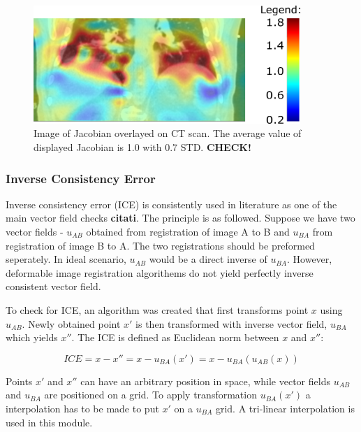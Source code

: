 \documentclass[type=dr, dr=rernat, accentcolor=tud7b,colorbacktitle, bigchapter, openright, twoside, 12pt ]{tudthesis}
\begin{document}
\begin{figure}[H]
	\begin{center}
		\includegraphics[width=0.9\textwidth]{./Images/Jacobian.png}
		\caption{Image of Jacobian overlayed on CT scan. The average value of displayed Jacobian is 1.0 with 0.7 STD. \textbf{CHECK!}}
		\label{Jacobian}
	\end{center}
\end{figure}

\subsubsection{Inverse Consistency Error}
\label{ICE}

Inverse consistency error (ICE) is consistently used in literature as one of the main vector field checks \textbf{citati}. The principle is as followed. Suppose we have two vector fields - $u_{AB}$ obtained from registration of image A to B and $u_{BA}$ from registration of image B to A. The two registrations
should be preformed seperately. In ideal scenario, $u_{AB}$ would be a direct inverse of $u_{BA}$. However, deformable image registration algorithems do not yield perfectly inverse consistent vector field.

To check for ICE, an algorithm was created that first transforms point $x$ using $u_{AB}$. Newly obtained point $x'$ is then transformed with inverse vector
field, $u_{BA}$ which yields $x''$. The ICE is defined as Euclidean norm between $x$ and $x''$:

\begin{equation}
ICE = x - x'' = x - u_{BA}(x') = x - u_{BA}(u_{AB}(x))
\end{equation}

Points $x'$ and $x''$ can have an arbitrary position in space, while vector fields $u_{AB}$ and $u_{BA}$ are positioned on a grid. To apply transformation $u_{BA}(x')$ a interpolation has to be made to put $x'$ on a $u_{BA}$ grid. A tri-linear interpolation is used in this module.
\end{document}
